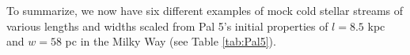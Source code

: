 \documentclass[twocolumn]{aastex62}
\newcommand{\kms}{\ensuremath{\textrm{km}~\textrm{s}^{-1}}}
\newcommand{\todo}[1]{{\color{red} TODO: #1}}
\begin{document}
To summarize, we now have six different examples of mock cold stellar streams of various lengths and widths scaled from Pal 5's initial properties of $l = 8.5$ kpc and $w = 58$ pc in the Milky Way (see Table \ref{tab:Pal5}).


%
%
%
%
%
%
\end{document}
